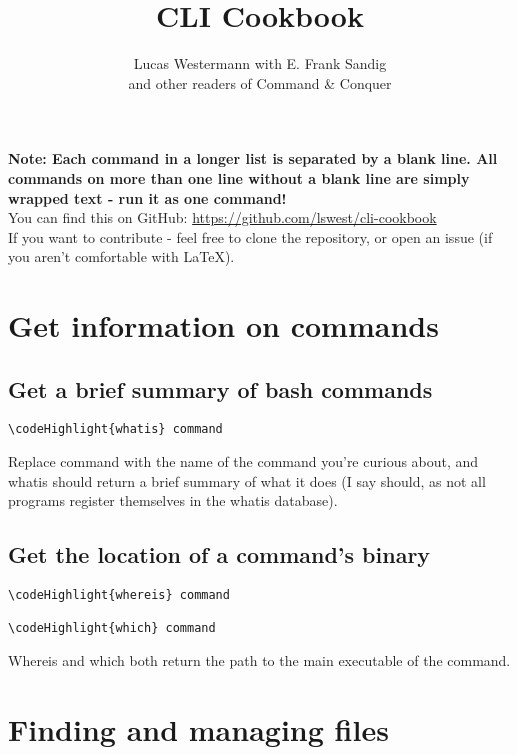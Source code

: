 \documentclass[12pt,a4paper]{article}
\begin{document}
\title{CLI Cookbook}
\author{Lucas Westermann with E. Frank Sandig \\ and other readers of Command \& Conquer}
\maketitle
\textbf{Note: Each command in a longer list is separated by a blank line.  All commands on more than one line without a blank line are simply wrapped text - run it as one command! } \\
You can find this on GitHub: \url{https://github.com/lswest/cli-cookbook}\\
If you want to contribute - feel free to clone the repository, or open an issue (if you aren't comfortable with \LaTeX).
\pagebreak
\tableofcontents
\pagebreak

\newcommand\codeHighlight[1]{\textcolor[rgb]{1,0,0}{\textbf{#1}}}

\section{Get information on commands}
\label{Get information on commands}

\subsection{Get a brief summary of bash commands}
\begin{Verbatim}[commandchars=\\\{\}]
\codeHighlight{whatis} command
\end{Verbatim}
Replace command with the name of the command you're curious about, and whatis should return a brief summary of what it does (I say should, as not all programs register themselves in the whatis database).

\subsection{Get the location of a command's binary}
\begin{Verbatim}[commandchars=\\\{\}]
\codeHighlight{whereis} command

\codeHighlight{which} command
\end{Verbatim}
Whereis and which both return the path to the main executable of the command.

\section{Finding and managing files}
\label{Finding and managing files}
\end{document}

